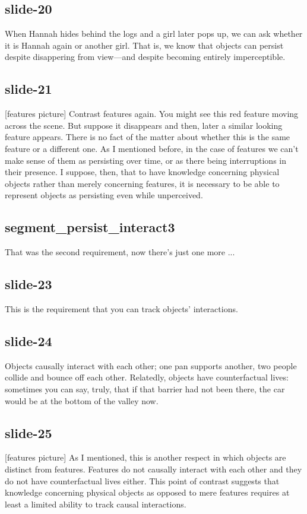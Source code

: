 \documentclass[12pt,\papersize]{extarticle}
\begin{document}
\subsection{slide-20}
When Hannah hides behind the logs and a girl later pops up, we can ask whether it is Hannah 
again or another girl.
That is, we know that objects can persist despite disappering from view---and despite becoming 
entirely imperceptible.
 
\subsection{slide-21}
[features picture]
Contrast features again.  You might see this red feature moving across the scene. 
But suppose it disappears and then, later a similar looking feature appears. 
There is no fact of the matter about whether this is the same feature or a different one.
As I mentioned before, in the case of features we can't make sense of them as persisting over 
time, or as there being interruptions in their presence.
I suppose, then, that to have knowledge concerning physical objects rather than merely 
concerning features, it is necessary to be able to represent objects as persisting
even while unperceived.
 
\subsection{segment\_persist\_interact3}
That was the second requirement, now there's just one more ...
 
\subsection{slide-23}
This is the requirement that you can track objects' interactions.
 
\subsection{slide-24}
Objects causally interact with each other; one pan supports another, two people collide and 
bounce off each other.  Relatedly, objects have counterfactual lives: sometimes you can say,
truly, that if that barrier had not been there, the car would be at the bottom of the valley 
now.
 
\subsection{slide-25}
[features picture]
As I mentioned, this is another respect in which objects are distinct from features.
Features do not causally interact with each other and they do not have counterfactual lives 
either.
This point of contrast suggests that knowledge concerning physical objects as opposed to mere
features requires at least a limited ability to track causal interactions.
 
\end{document}
